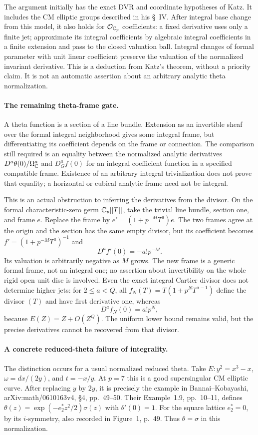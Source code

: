 The argument initially has the exact DVR and coordinate hypotheses
of Katz. It includes the CM elliptic groups described in his \S~IV.
After integral base change from this model, it also holds for
$\mathcal O_{\mathbb C_p}$ coefficients: a fixed derivative uses only a
finite jet; approximate its integral coefficients by algebraic
integral coefficients in a finite extension and pass to the closed
valuation ball. Integral changes of formal parameter with unit
linear coefficient preserve the valuation of the normalized
invariant derivative. This is a deduction from Katz's theorem,
without a priority claim. It is not an automatic assertion about
an arbitrary analytic theta normalization.

\paragraph{The remaining theta-frame gate.}
A theta function is a section of a line bundle. Extension as an
invertible sheaf over the formal integral neighborhood gives some
integral frame, but differentiating its coefficient depends on the
frame or connection. The comparison still required is an equality
between the normalized analytic derivatives
$D^a\theta(0)/\Omega_{\mathbb C}^a$ and $D_G^af(0)$ for an integral
coefficient function in a specified compatible frame. Existence of
an arbitrary integral trivialization does not prove that equality;
a horizontal or cubical analytic frame need not be integral.

This is an actual obstruction to inferring the derivatives from
the divisor. On the formal characteristic-zero germ
$\mathbb C_p[[T]]$, take the trivial line bundle, section one, and frame
$e$. Replace the frame by
$e'=(1+p^{-M}T^a)e$. The two frames agree at the origin and the
section has the same empty divisor, but its coefficient becomes
$f'=(1+p^{-M}T^a)^{-1}$ and
\[
 D^af'(0)=-a!p^{-M}.
\]
Its valuation is arbitrarily negative as $M$ grows. The new frame
is a generic formal frame, not an integral one; no assertion about
invertibility on the whole rigid open unit disc is involved.
Even the exact integral Cartier divisor does not determine higher
jets: for $2\leq a<Q$, all
$f_N(T)=T(1+p^NT^{a-1})$ define the divisor $(T)$ and have first
derivative one, whereas
\[
 D^af_N(0)=a!p^N,
\]
because $E(Z)=Z+O(Z^Q)$. The uniform lower bound remains valid,
but the precise derivatives cannot be recovered from that divisor.

\paragraph{A concrete reduced-theta failure of integrality.}
The distinction occurs for a usual normalized reduced theta.
Take $E:y^2=x^3-x$, $\omega=dx/(2y)$, and $t=-x/y$.
At $p=7$ this is a good supersingular CM elliptic curve.
After replacing $y$ by $2y$, it is precisely the example in
Bannai--Kobayashi, arXiv:math/0610163v4, \S4, pp.~49--50.
Their Example~1.9, pp.~10--11, defines
$\theta(z)=\exp(-e_2^*z^2/2)\sigma(z)$ with $\theta'(0)=1$.
For the square lattice $e_2^*=0$, by its $i$-symmetry, also recorded
in Figure~1, p.~49. Thus $\theta=\sigma$ in this normalization.

